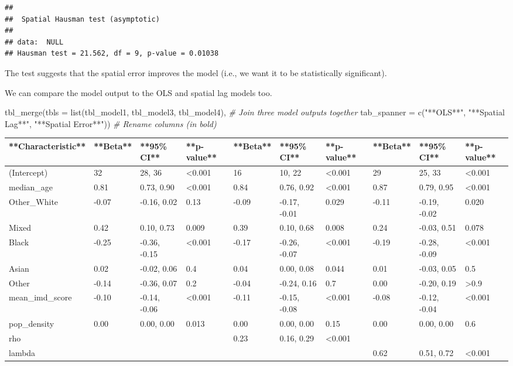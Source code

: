 \documentclass[
]{book}
\newenvironment{Shaded}{\begin{snugshade}}{\end{snugshade}}
\newcommand{\AttributeTok}[1]{\textcolor[rgb]{0.77,0.63,0.00}{#1}}
\newcommand{\CommentTok}[1]{\textcolor[rgb]{0.56,0.35,0.01}{\textit{#1}}}
\newcommand{\FunctionTok}[1]{\textcolor[rgb]{0.00,0.00,0.00}{#1}}
\newcommand{\NormalTok}[1]{#1}
\newcommand{\StringTok}[1]{\textcolor[rgb]{0.31,0.60,0.02}{#1}}
\begin{document}
\begin{verbatim}
## 
##  Spatial Hausman test (asymptotic)
## 
## data:  NULL
## Hausman test = 21.562, df = 9, p-value = 0.01038
\end{verbatim}

The test suggests that the spatial error improves the model (i.e., we want it to be statistically significant).

We can compare the model output to the OLS and spatial lag models too.

\begin{Shaded}
\begin{Highlighting}[]
\FunctionTok{tbl\_merge}\NormalTok{(}\AttributeTok{tbls =} \FunctionTok{list}\NormalTok{(tbl\_model1, tbl\_model3, tbl\_model4), }\CommentTok{\# Join three model outputs together}
          \AttributeTok{tab\_spanner =} \FunctionTok{c}\NormalTok{(}\StringTok{"**OLS**"}\NormalTok{, }\StringTok{"**Spatial Lag**"}\NormalTok{, }\StringTok{"**Spatial Error**"}\NormalTok{)) }\CommentTok{\# Rename columns (in bold)}
\end{Highlighting}
\end{Shaded}

\begin{tabular}{l|l|l|l|l|l|l|l|l|l}
\hline
**Characteristic** & **Beta** & **95\% CI** & **p-value** & **Beta** & **95\% CI** & **p-value** & **Beta** & **95\% CI** & **p-value**\\
\hline
(Intercept) & 32 & 28, 36 & <0.001 & 16 & 10, 22 & <0.001 & 29 & 25, 33 & <0.001\\
\hline
median\_age & 0.81 & 0.73, 0.90 & <0.001 & 0.84 & 0.76, 0.92 & <0.001 & 0.87 & 0.79, 0.95 & <0.001\\
\hline
Other\_White & -0.07 & -0.16, 0.02 & 0.13 & -0.09 & -0.17, -0.01 & 0.029 & -0.11 & -0.19, -0.02 & 0.020\\
\hline
Mixed & 0.42 & 0.10, 0.73 & 0.009 & 0.39 & 0.10, 0.68 & 0.008 & 0.24 & -0.03, 0.51 & 0.078\\
\hline
Black & -0.25 & -0.36, -0.15 & <0.001 & -0.17 & -0.26, -0.07 & <0.001 & -0.19 & -0.28, -0.09 & <0.001\\
\hline
Asian & 0.02 & -0.02, 0.06 & 0.4 & 0.04 & 0.00, 0.08 & 0.044 & 0.01 & -0.03, 0.05 & 0.5\\
\hline
Other & -0.14 & -0.36, 0.07 & 0.2 & -0.04 & -0.24, 0.16 & 0.7 & 0.00 & -0.20, 0.19 & >0.9\\
\hline
mean\_imd\_score & -0.10 & -0.14, -0.06 & <0.001 & -0.11 & -0.15, -0.08 & <0.001 & -0.08 & -0.12, -0.04 & <0.001\\
\hline
pop\_density & 0.00 & 0.00, 0.00 & 0.013 & 0.00 & 0.00, 0.00 & 0.15 & 0.00 & 0.00, 0.00 & 0.6\\
\hline
rho &  &  &  & 0.23 & 0.16, 0.29 & <0.001 &  &  & \\
\hline
lambda &  &  &  &  &  &  & 0.62 & 0.51, 0.72 & <0.001\\
\hline
\end{tabular}
\end{document}
